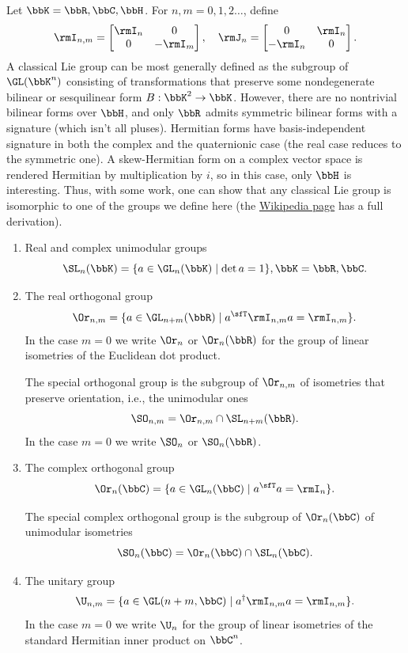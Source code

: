 \begin{example}
    Let $\bbK=\bbR,\bbC,\bbH$. For $n,m=0,1,2\ldots$, define
    \[\rmI_{n,m}=
    \begin{bmatrix}
        \rmI_n&0\\0&-\rmI_m
    \end{bmatrix},\quad \rmJ_n=
    \begin{bmatrix}
        0&\rmI_n\\-\rmI_n&0
    \end{bmatrix}.
    \]
    A classical Lie group can be most generally defined as the subgroup of $\GL(\bbK^n)$ consisting of transformations that preserve some nondegenerate bilinear or sesquilinear form $B:\bbK^2\to \bbK$. However, there are no nontrivial bilinear forms over $\bbH$, and only $\bbR$ admits symmetric bilinear forms with a signature (which isn't all pluses). Hermitian forms have basis-independent signature in both the complex and the quaternionic case (the real case reduces to the symmetric one). A skew-Hermitian form on a complex vector space is rendered Hermitian by multiplication by $i$, so in this case, only $\bbH$ is interesting. Thus, with some work, one can show that any classical Lie group is isomorphic to one of the groups we define here (the \href{https://en.wikipedia.org/wiki/Classical_group}{Wikipedia page} has a full derivation).
    \begin{enumerate}
        \item Real and complex unimodular groups
        \[\SL_n(\bbK)=\{a\in\GL_n(\bbK)\mid \det a=1\}, \bbK=\bbR,\bbC.\]
        \item The real orthogonal group
        \[\Or_{n,m}=\{a\in\GL_{n+m}(\bbR)\mid a^\sfT  \rmI_{n,m}a=\rmI_{n,m}\}.\]
        In the case $m=0$ we write $\Or_n$ or $\Or_n(\bbR)$ for the group of linear isometries of the Euclidean dot product.

        The special orthogonal group is the subgroup of $\Or_{n,m}$ of isometries that preserve orientation, i.e., the unimodular ones
        \[\SO_{n,m}=\Or_{n,m}\cap \SL_{n+m}(\bbR).\]
        In the case $m=0$ we write $\SO_n$ or $\SO_n(\bbR)$.
        \item The complex orthogonal group
        \[\Or_{n}(\bbC)=\{a\in\GL_{n}(\bbC)\mid a^\sfT  a=\rmI_{n}\}.\]

        The special complex orthogonal group is the subgroup of $\Or_{n}(\bbC)$ of unimodular isometries
        \[\SO_{n}(\bbC)=\Or_{n}(\bbC)\cap \SL_{n}(\bbC).\]
        \item The unitary group
        \[\U_{n,m}=\{a\in \GL(n+m,\bbC)\mid a^\dagger \rmI_{n,m}a=\rmI_{n,m}\}.\]
        In the case $m=0$ we write $\U_n$ for the group of linear isometries of the standard Hermitian inner product on $\bbC^n$.


\end{enumerate}
\end{example}
